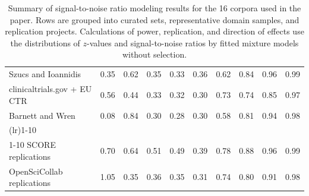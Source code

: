 \begin{table}
\begin{tabular}{lccccccccc}
Szucs and Ioannidis & 0.35 & 0.62 & 0.35 & 0.33 & 0.36 & 0.62 & 0.84 & 0.96 & 0.99\\
clinicaltrials.gov + EU CTR & 0.56 & 0.44 & 0.33 & 0.32 & 0.30 & 0.73 & 0.74 & 0.85 & 0.97\\
Barnett and Wren & 0.08 & 0.84 & 0.30 & 0.28 & 0.30 & 0.58 & 0.81 & 0.94 & 0.98\\
\addlinespace
\cmidrule(lr){1-10}
\multicolumn{10}{l}{\emph{Replication efforts}}\\
\cmidrule(lr){1-10}
SCORE replications & 0.70 & 0.64 & 0.51 & 0.49 & 0.39 & 0.78 & 0.88 & 0.96 & 0.99\\
OpenSciCollab replications & 1.05 & 0.35 & 0.36 & 0.35 & 0.31 & 0.74 & 0.80 & 0.91 & 0.98\\
\bottomrule
\end{tabular}
\caption{Summary of signal-to-noise ratio modeling results for the 16 corpora used in the paper. Rows are grouped into curated sets, representative domain samples, and replication projects. Calculations of power, replication, and direction of effects use the distributions of $z$-values and signal-to-noise ratios by fitted mixture models without selection.}
\label{tab:results_summary_table2}
\end{table}

